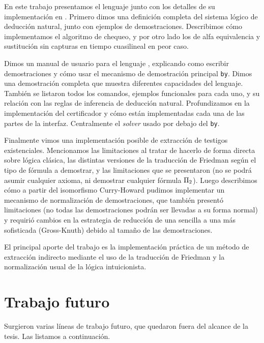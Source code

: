 En este trabajo presentamos el lenguaje \ppaLang{} junto con los detalles de su
implementación en \ppaTool{}. Primero dimos una definición completa del sistema
lógico de deducción natural, junto con ejemplos de demostraciones. Describimos
cómo implementamos el algoritmo de chequeo, y por otro lado los de
alfa equivalencia y sustitución sin capturas en tiempo cuasilineal en peor caso.

Dimos un manual de usuario para el lenguaje \ppaLang{}, explicando como
escribir demostraciones y cómo usar el mecanismo de demostración principal
\lstinline{by}. Dimos una demostración completa que muestra diferentes capacidades del lenguaje. También se listaron
todos los comandos, ejemplos funcionales para cada uno, y su relación con las
reglas de inferencia de deducción natural. Profundizamos en la implementación
del certificador y cómo están implementadas cada una de las partes de la
interfaz. Centralmente el \textit{solver} usado por debajo del \lstinline{by}.

Finalmente vimos una implementación posible de extracción de testigos
existenciales. Mencionamos las limitaciones al tratar de hacerlo de forma
directa sobre lógica clásica, las distintas versiones de la traducción de
Friedman según el tipo de fórmula a demostrar, y las limitaciones que se
presentaron (no se podrá asumir cualquier axioma, ni demostrar cualquier fórmula
$\Pi_{2}$). Luego describimos cómo a partir del isomorfismo Curry-Howard
pudimos implementar un mecanismo de normalización de demostraciones, que también
presentó limitaciones (no todas las demostraciones podrán ser llevadas a su
forma normal) y requirió cambios en la estrategia de reducción de una sencilla a
una más sofisticada (Gross-Knuth) debido al tamaño de las demostraciones.

El principal aporte del trabajo es la implementación práctica de un método de
extracción indirecto mediante el uso de la traducción de Friedman y la
normalización usual de la lógica intuicionista.

\section{Trabajo futuro}

Surgieron varias líneas de trabajo futuro, que quedaron fuera del alcance de la
tesis. Las listamos a continuación.

